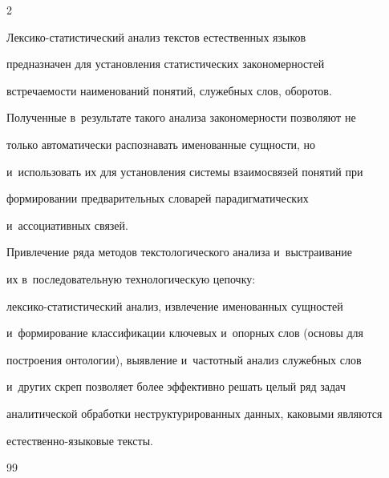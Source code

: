 \begin{multicols}{2}
     


     Лексико-статистический анализ текстов естественных языков 


предназначен для установления статистических закономерностей 


встре\-ча\-емости наименований понятий, служебных слов, оборотов. 


Полученные в~результате такого анализа закономерности позволяют не 


только автоматически распознавать именованные сущности, но 


и~использовать их для установления системы взаимосвязей понятий при 


формировании предварительных словарей парадигматических 


и~ассоциативных связей.


{ %





}


     


     Привлечение ряда методов текстологического анализа и~выстраивание 


их в~последовательную технологическую цепочку:  


лек\-си\-ко-ста\-ти\-сти\-че\-ский анализ, извлечение именованных сущностей 


и~формирование классификации ключевых и~опорных слов (основы для 


построения онтологии), выявление и~частотный анализ служебных слов 


и~других скреп позволяет более эффективно решать целый ряд задач 


аналитической обработки неструктурированных данных, каковыми являются 


ес\-тест\-вен\-но-язы\-ко\-вые тексты.





\vspace*{-12pt} 


    


{\small\frenchspacing


 {\baselineskip=10.9pt




 \begin{thebibliography}{99}



\end{thebibliography}}}
\end{multicols}
